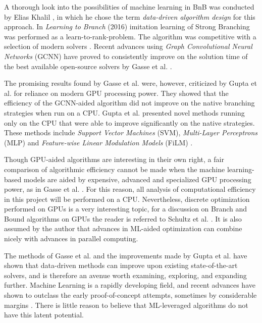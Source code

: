 A thorough look into the possibilities of machine learning in \gls{BnB} was conducted by Elias Khalil \cite{khalil2020towards}, in which he chose the term \textit{data-driven algorithm design} for this approach. 
In \textit{Learning to Branch} (2016) \cite{khalil2016learning} imitation learning of Strong Branching was performed as a learn-to-rank-problem. The algorithm was competitive with a selection of modern solvers \cite{khalil2016learning}. 
Recent advances using\textit{ Graph Convolutional Neural Networks} (\Gls{GCNN}) have proved to consistently improve on the solution time of the best available open-source solvers by Gasse et al.  \cite{gasse2019exact}. 

The promising results found by Gasse et al. \cite{gasse2019exact} were, however, criticized by Gupta et al. \cite{gupta2020hybrid} for reliance on modern \gls{GPU} processing power. They showed that the efficiency of the GCNN-aided algorithm did not improve on the native branching strategies when run on a CPU. Gupta et al. presented novel methods running only on the CPU that were able to improve significantly on the native strategies. These methods include \textit{Support Vector Machines} (\Gls{SVM}), \textit{Multi-Layer Perceptrons} (\Gls{MLP}) and  \textit{Feature-wise Linear Modulation Models} (\gls{FiLM}) \cite{gupta2020hybrid}. 

Though GPU-aided algorithms are interesting in their own right, a fair comparison of algorithmic efficiency cannot be made when the machine learning-based models are aided by expensive, advanced and specialized GPU processing power, as in Gasse et al. \cite{gasse2019exact}. 
For this reason, all analysis of computational efficiency in this project will be performed on a CPU. Nevertheless, discrete optimization performed on GPUs is a very interesting topic, for a discussion on Branch and Bound algorithms on GPUs the reader is referred to Schultz et al. \cite{schulz2013gpu}. It is also assumed by the author that advances in ML-aided optimization can combine nicely with advances in parallel computing.

The methods of Gasse et al. \cite{gasse2019exact} and the improvements made by Gupta et al. \cite{gupta2020hybrid} have shown that data-driven methods can improve upon existing state-of-the-art solvers, and is therefore an avenue worth examining, exploring, and expanding further. Machine Learning is a rapidly developing field, and recent advances have shown to outclass the early proof-of-concept attempts, sometimes by considerable margins \cite{holzinger2018current}. There is little reason to believe that ML-leveraged algorithms do not have this latent potential. 

